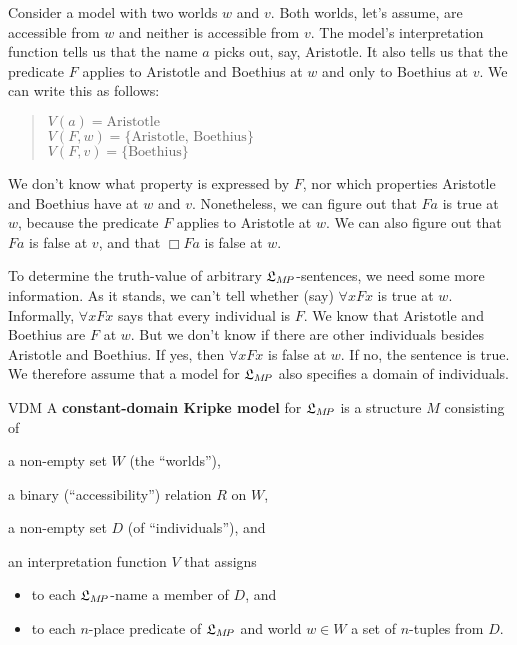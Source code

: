 Consider a model with two worlds $w$ and $v$. Both worlds, let's assume, are
accessible from $w$ and neither is accessible from $v$. The model's
interpretation function tells us that the name $a$ picks out, say, Aristotle. It
also tells us that the predicate $F$ applies to Aristotle and Boethius at $w$
and only to Boethius at $v$. We can write this as follows:
%
\begin{quote}
  $V(a) = \text{Aristotle}$\\
  $V(F,w) = \{ \text{Aristotle, Boethius} \}$\\
  $V(F,v) = \{ \text{Boethius} \}$
\end{quote}
%
\noindent%
We don't know what property is expressed by $F$, nor which properties Aristotle
and Boethius have at $w$ and $v$. Nonetheless, we can figure out that $Fa$ is
true at $w$, because the predicate $F$ applies to Aristotle at $w$. We can also
figure out that $Fa$ is false at $v$, and that $\Box Fa$ is false at $w$.

To determine the truth-value of arbitrary $\mathfrak{L}_{M\!P}$-sentences, we need some
more information. As it stands, we can't tell whether (say) $\forall x Fx$ is
true at $w$. Informally, $\forall x Fx$ says that every individual is $F$. We
know that Aristotle and Boethius are $F$ at $w$. But we don't know if there are
other individuals besides Aristotle and Boethius. If yes, then $\forall x Fx$ is
false at $w$. If no, the sentence is true. We therefore assume that a model for
$\mathfrak{L}_{M\!P}$ also specifies a domain of individuals.

\begin{definition}{}{VDM}
  A \textbf{constant-domain Kripke model} for $\mathfrak{L}_{M\!P}$ is a structure $M$
  consisting of%
  \medskip
  \begin{compactenum}
    \item a non-empty set $W$ (the ``worlds''),
    \item a binary (``accessibility'') relation $R$ on $W$,
    \item a non-empty set $D$ (of ``individuals''), and
    \item an interpretation function $V$ that assigns%
    \vspace{-1mm}
    \begin{itemize}
      \itemsep-1mm
      \item to each $\mathfrak{L}_{M\!P}$-name a member of $D$, and
      \item to each $n$-place predicate of $\mathfrak{L}_{M\!P}$ and world $w \in W$ a set of
            $n$-tuples from $D$.
    \end{itemize}
  \end{compactenum}
\end{definition}

